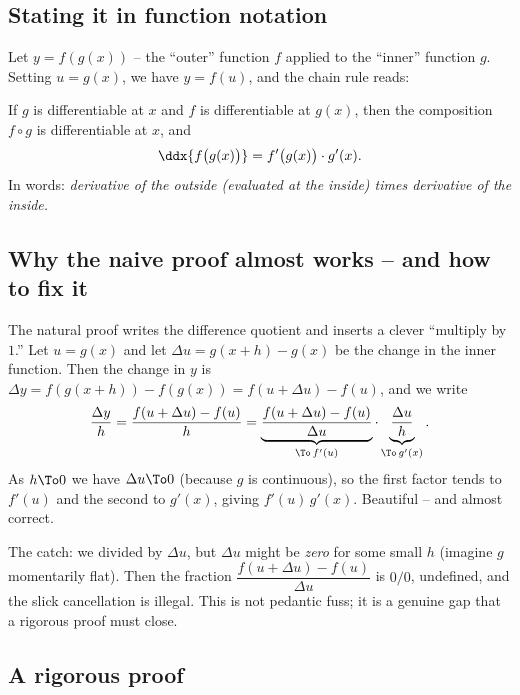 \subsection{Stating it in function notation}

Let $y = f(g(x))$ -- the ``outer'' function $f$ applied to the ``inner'' function $g$.
Setting $u = g(x)$, we have $y = f(u)$, and the chain rule reads:

\begin{theorem}\label{ch11:thm-chain}
If $g$ is differentiable at $x$ and $f$ is differentiable at $g(x)$, then the composition
$f\circ g$ is differentiable at $x$, and
\[
  \ddx{f\big(g(x)\big)} = f'\big(g(x)\big)\cdot g'(x).
\]
In words: \emph{derivative of the outside (evaluated at the inside) times derivative of
the inside.}
\end{theorem}

\subsection{Why the naive proof almost works -- and how to fix it}

The natural proof writes the difference quotient and inserts a clever ``multiply by
$1$.'' Let $u=g(x)$ and let $\Delta u = g(x+h)-g(x)$ be the change in the inner function.
Then the change in $y$ is $\Delta y = f(g(x+h)) - f(g(x)) = f(u+\Delta u) - f(u)$, and we
write
\[
  \frac{\Delta y}{h}
  = \frac{f(u+\Delta u) - f(u)}{h}
  = \underbrace{\frac{f(u+\Delta u) - f(u)}{\Delta u}}_{\To\, f'(u)}
    \cdot
    \underbrace{\frac{\Delta u}{h}}_{\To\, g'(x)}.
\]
As $h\To 0$ we have $\Delta u \To 0$ (because $g$ is continuous), so the first factor
tends to $f'(u)$ and the second to $g'(x)$, giving $f'(u)\,g'(x)$. Beautiful -- and almost
correct.

\begin{trapbox}
The catch: we divided by $\Delta u$, but $\Delta u$ might be \emph{zero} for some small
$h$ (imagine $g$ momentarily flat). Then the fraction $\dfrac{f(u+\Delta u)-f(u)}{\Delta
u}$ is $0/0$, undefined, and the slick cancellation is illegal. This is not pedantic
fuss; it is a genuine gap that a rigorous proof must close.
\end{trapbox}

\subsection{A rigorous proof}

